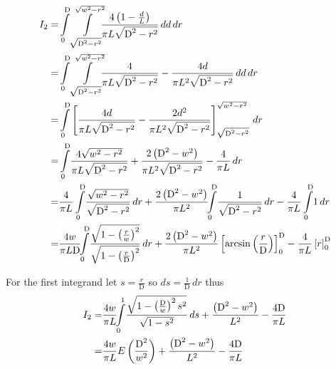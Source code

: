 \begin{align*}
I_{2}=&\intop_{0}^{\text{D}}
\intop_{\sqrt{\text{D}^{2}-r^{2}}}^{\sqrt{w^{2}-r^{2}}}\!\!\!
\frac{4 \left(1-\frac{d}{L}\right)}{\pi  L \sqrt{\text{D}^2-r^2}}\,dd\,dr\\
=&\intop_{0}^{\text{D}}
\intop_{\sqrt{\text{D}^{2}-r^{2}}}^{\sqrt{w^{2}-r^{2}}}\!\!\!
\frac{4}{\pi  L \sqrt{\text{D}^2-r^2}} 
-\frac{4 d}{\pi  L^{2} \sqrt{\text{D}^2-r^2}}
\,dd\,dr\\
=&\intop_{0}^{\text{D}}
\left[
\frac{4 d}{\pi  L \sqrt{\text{D}^2-r^2}} 
-\frac{2 d^{2}}{\pi  L^{2} \sqrt{\text{D}^2-r^2}}
\right]_{\sqrt{\text{D}^{2}-r^{2}}}^{\sqrt{w^{2}-r^{2}}}
\,dr\\
=&
\intop_{0}^{\text{D}}\!
\frac{4 \sqrt{w^2-r^2}}{\pi  L\sqrt{\text{D}^2-r^2}}
+\frac{2 \left(\text{D}^2-w^2\right)}{\pi  L^2\sqrt{\text{D}^2-r^2}}
-\frac{4}{\pi  L}
\,dr\\
=&
\frac{4}{\pi  L}
\intop_{0}^{\text{D}}\!
\frac{\sqrt{w^2-r^2}}{\sqrt{\text{D}^2-r^2}}
\,dr
+\frac{2 \left(\text{D}^2-w^2\right)}{\pi  L^2}\!\!
\intop_{0}^{\text{D}}\!
\frac{1}{\sqrt{\text{D}^2-r^2}}
\,dr
-\frac{4}{\pi  L}
\intop_{0}^{\text{D}}\!
1
\,dr\\
=&
\frac{4 w}{\pi  L \text{D}}\!\!
\intop_{0}^{\text{D}}\!
\frac{\sqrt{1-\left(\frac{r}{w}\right)^2}}{\sqrt{1-\left(\frac{r}{\text{D}}\right)^2}}
\,dr
+\frac{2 \left(\text{D}^2-w^2\right)}{\pi  L^2}\left[
\arcsin\left(\frac{r}{\text{D}}\right)
\right]_{0}^{\text{D}}
-\frac{4}{\pi  L}\left[
r
\right]_{0}^{\text{D}}
\end{align*}

For the first integrand let $s=\frac{r}{\text{D}}$ so $ds=\frac{1}{\text{D}}\,dr$ thus
\begin{align*}
I_{2}=&
\frac{4 w}{\pi  L }\!\!
\intop_{0}^{1}\!
\frac{\sqrt{1-\left(\frac{\text{D}}{w}\right)^{2}s^{2}}}{\sqrt{1-s^2}}
\,ds
+\frac{\left(\text{D}^2-w^2\right)}{ L^2}
-\frac{4 \text{D}}{\pi  L}\\
=&\frac{4 w}{\pi  L }E\left(\frac{\text{D}^2}{w^2}\right)
+\frac{\left(\text{D}^2-w^2\right)}{ L^2}
-\frac{4 \text{D}}{\pi  L}
\end{align*}

